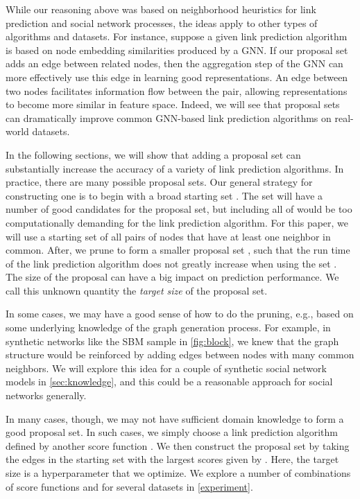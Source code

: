 \documentclass{article}
\newcommand{\xhdr}[1]{\vspace{1.0mm}\noindent{\textbf{#1.}}\hspace{1mm}}
\begin{document}
While our reasoning above was based on neighborhood heuristics for link prediction and social network processes,
the ideas apply to other types of algorithms and datasets.
For instance, suppose a given link prediction algorithm is based on node embedding similarities produced by a GNN. 
If our proposal set adds an edge between related nodes,
then the aggregation step of the GNN can more effectively use this edge in learning good representations. 
An edge between two nodes facilitates information flow between the pair, allowing representations to become more similar in feature space.
Indeed, we will see that proposal sets can dramatically improve common GNN-based link prediction algorithms on real-world datasets.



\xhdr{Basic proposal set construction algorithms}
In the following sections, we will show that adding a proposal set can substantially increase the accuracy of a variety of link prediction algorithms.
In practice, there are many possible proposal sets.
Our general strategy for constructing one is to begin with a broad starting set .
The set  will have a number of good candidates for the proposal set, but including all of  would be too computationally demanding for the link prediction algorithm.
For this paper, we will use a starting set of all pairs of nodes that have at least one neighbor in common.
After, we prune  to form a smaller proposal set , such that the run time of the link prediction algorithm does not greatly increase when using the set .
The size of the proposal can have a big impact on prediction performance.
We call this unknown quantity the \emph{target size} of the proposal set.

In some cases, we may have a good sense of how to do the pruning, e.g., based on some underlying knowledge of the graph generation process.
For example, in synthetic networks like the SBM sample in \cref{fig:block}, we knew that the graph structure would be reinforced by adding edges between nodes with many common neighbors.
We will explore this idea for a couple of synthetic social network models in \cref{sec:knowledge},
and this could be a reasonable approach for social networks generally.

In many cases, though, we may not have sufficient domain knowledge to form a good proposal set.
In such cases, we simply choose a link prediction algorithm defined by another score function .
We then construct the proposal set by taking the  edges in the starting set  with the largest scores given by .
Here, the target size  is a hyperparameter that we optimize. 
We explore a number of combinations of score functions  and  for several datasets in \cref{experiment}.
\end{document}
